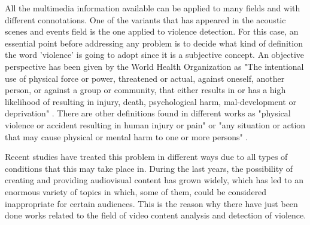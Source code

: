 	All the multimedia information available can be applied to many fields and with different connotations. One of the variants that has appeared in the acoustic scenes and events field is the one applied to violence detection. For this case, an essential point before addressing any problem is to decide what kind of definition the word 'violence' is going to adopt since it is a subjective concept. An objective perspective has been given by the World Health Organization as "The  intentional  use  of physical  force  or  power,  threatened  or  actual,  against oneself, another person, or against a group or community, that either results in or has a high likelihood of resulting in injury,  death,  psychological  harm,  mal-development  or deprivation" \cite{Krug2002}. There are other definitions found in different works as "physical violence or accident resulting in human injury or pain" \cite{Demarty2013} or "any situation or action that may cause physical or mental harm to one or more persons" \cite{Giannakopoulos2006}.
	
	Recent studies have treated this problem in different ways due to all types of conditions that this may take place in. During the last years, the possibility of creating and providing audiovisual content has grown widely, which has led to an enormous variety of topics in which, some of them, could be considered inappropriate for certain  audiences. This is the reason why there have just been done works related to the field of video content analysis and detection of violence. 
	
